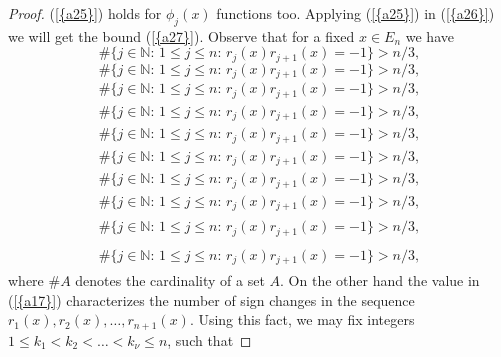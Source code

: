 \documentclass{amsart}
\numberwithin{equation}{section}
\begin{document}
\begin{proof}
{(\ref{{a25}})} holds for $\phi_j(x)$ functions too. Applying {(\ref{{a25}})} in {(\ref{{a26}})} we will get the bound {(\ref{{a27}})}. Observe that for a fixed $x\in E_n$ we have
{
\begin{equation*} \label{a17}
\#\{j\in{\ensuremath{\mathbb N}}:\,1\le j\le n:\, r_j(x)r_{j+1}(x)=-1\}>n/3,
 \end{equation*}\fi  
{}\begin{equation}\label{a17}
\#\{j\in{\ensuremath{\mathbb N}}:\,1\le j\le n:\, r_j(x)r_{j+1}(x)=-1\}>n/3,
\end{equation}\fi   
{}\begin{align*}\label{a17}
\#\{j\in{\ensuremath{\mathbb N}}:\,1\le j\le n:\, r_j(x)r_{j+1}(x)=-1\}>n/3,
\end{align*}\fi   
{}\begin{align}\label{a17}
\#\{j\in{\ensuremath{\mathbb N}}:\,1\le j\le n:\, r_j(x)r_{j+1}(x)=-1\}>n/3,
\end{align}\fi    
{}\begin{gather*}\label{a17}
\#\{j\in{\ensuremath{\mathbb N}}:\,1\le j\le n:\, r_j(x)r_{j+1}(x)=-1\}>n/3,
\end{gather*}\fi  
{}\begin{gather}\label{a17}
\#\{j\in{\ensuremath{\mathbb N}}:\,1\le j\le n:\, r_j(x)r_{j+1}(x)=-1\}>n/3,
\end{gather}\fi   
{}\begin{multline*}\label{a17}
\#\{j\in{\ensuremath{\mathbb N}}:\,1\le j\le n:\, r_j(x)r_{j+1}(x)=-1\}>n/3,
\end{multline*}\fi  
{}\begin{multline}\label{a17}
\#\{j\in{\ensuremath{\mathbb N}}:\,1\le j\le n:\, r_j(x)r_{j+1}(x)=-1\}>n/3,
\end{multline}\fi  
{}\begin{multline*}\begin{split}\label{a17}
\#\{j\in{\ensuremath{\mathbb N}}:\,1\le j\le n:\, r_j(x)r_{j+1}(x)=-1\}>n/3,
\end{split}\end{multline*}\fi
{}\begin{multline}\begin{split}\label{a17}
\#\{j\in{\ensuremath{\mathbb N}}:\,1\le j\le n:\, r_j(x)r_{j+1}(x)=-1\}>n/3,
\end{split}\end{multline}\fi
}
where $\#A$ denotes the cardinality of a set $A$. On the other hand the value in {(\ref{{a17}})} characterizes the number of  sign changes in the sequence $r_1(x),r_2(x),\ldots ,r_{n+1}(x)$. Using this fact, we may fix integers $1\le k_1<k_2<\ldots<k_\nu\le n$, such that

\end{proof}
\end{document}
